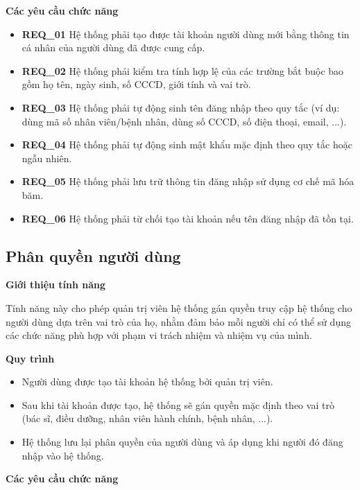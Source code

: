\noindent \textbf{Các yêu cầu chức năng}

\begin{itemize}
    \item \textbf{REQ\_01} Hệ thống phải tạo được tài khoản người dùng mới bằng thông tin cá nhân của người dùng đã được cung cấp.
    \item \textbf{REQ\_02} Hệ thống phải kiểm tra tính hợp lệ của các trường bắt buộc bao gồm họ tên, ngày sinh, số CCCD, giới tính và vai trò.
    \item \textbf{REQ\_03} Hệ thống phải tự động sinh tên đăng nhập theo quy tắc (ví dụ: dùng mã số nhân viên/bệnh nhân, dùng số CCCD, số điện thoại, email, ...).
    \item \textbf{REQ\_04} Hệ thống phải tự động sinh mật khẩu mặc định theo quy tắc hoặc ngẫu nhiên.
    \item \textbf{REQ\_05} Hệ thống phải lưu trữ thông tin đăng nhập sử dụng cơ chế mã hóa băm.
    \item \textbf{REQ\_06} Hệ thống phải từ chối tạo tài khoản nếu tên đăng nhập đã tồn tại.
\end{itemize}

\subsection{Phân quyền người dùng}

\noindent \textbf{Giới thiệu tính năng}

Tính năng này cho phép quản trị viên hệ thống gán quyền truy cập hệ thống cho người dùng dựa trên vai trò của họ, nhằm đảm bảo mỗi người chỉ có thể sử dụng các chức năng phù hợp với phạm vi trách nhiệm và nhiệm vụ của mình.

\noindent \textbf{Quy trình}

\begin{itemize} 
    \item Người dùng được tạo tài khoản hệ thống bởi quản trị viên.

    \item Sau khi tài khoản được tạo, hệ thống sẽ gán quyền mặc định theo vai trò (bác sĩ, điều dưỡng, nhân viên hành chính, bệnh nhân, ...).

    \item Hệ thống lưu lại phân quyền của người dùng và áp dụng khi người đó đăng nhập vào hệ thống.
\end{itemize}

\noindent \textbf{Các yêu cầu chức năng}

